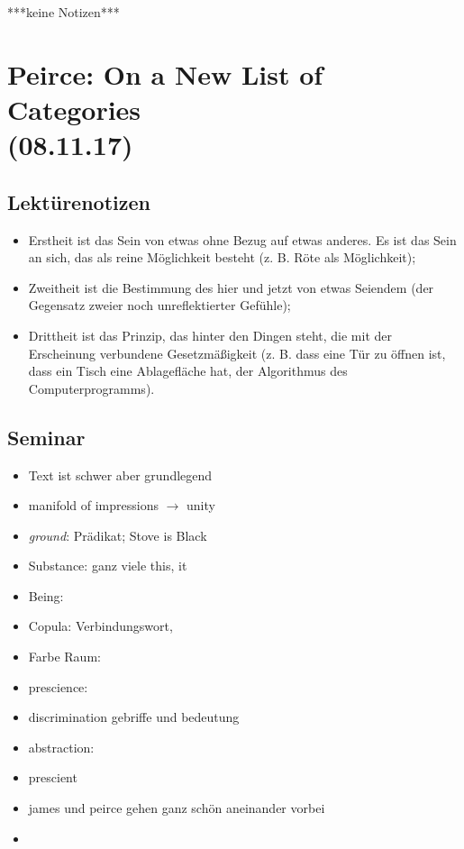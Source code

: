 \documentclass[emulatestandardclasses]{scrartcl}
\begin{document}
***keine Notizen***

\section{Peirce: On a New List of Categories\\(08.11.17)}

\subsection{Lektürenotizen}

\begin{itemize}
  \item Erstheit ist das Sein von etwas ohne Bezug auf etwas anderes. Es ist das Sein an sich, das als reine Möglichkeit besteht (z. B. Röte als Möglichkeit);
  \item Zweitheit ist die Bestimmung des hier und jetzt von etwas Seiendem (der Gegensatz zweier noch unreflektierter Gefühle); 
  \item Drittheit ist das Prinzip, das hinter den Dingen steht, die mit der Erscheinung verbundene Gesetzmäßigkeit (z. B. dass eine Tür zu öffnen ist, dass ein Tisch eine Ablagefläche hat, der Algorithmus des Computerprogramms).

\end{itemize}



\subsection{Seminar}

\begin{itemize}
  \item Text ist schwer aber grundlegend
  \item manifold of impressions $\rightarrow$ unity
  \item \emph{ground}: Prädikat; Stove is Black
  \item Substance: ganz viele this, it
  \item Being: 
  \item Copula: Verbindungswort, 
  \item Farbe Raum: 
  \item prescience: 
  \item discrimination gebriffe und bedeutung
  \item abstraction: 
  \item prescient 
  \item james und peirce gehen ganz schön aneinander vorbei
  \item 
\end{itemize}
\end{document}
